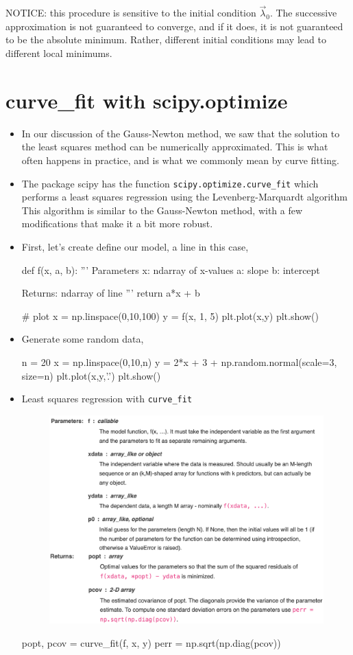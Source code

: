 \documentclass[12pt]{article}
\numberwithin{equation}{section}
\begin{document}
\begin{itemize}
NOTICE: this procedure is sensitive to the initial condition $ \vec{\lambda}_0 $. The successive approximation is not guaranteed to converge, and if it does, it is not guaranteed to be the absolute minimum. Rather, different initial conditions may lead to different local minimums.

\end{itemize}

\section{curve\_fit with scipy.optimize}
\begin{itemize}
\item In our discussion of the Gauss-Newton method, we saw that the solution to the least squares method can be numerically approximated. This is what often happens in practice, and is what we commonly mean by curve fitting.
\item The package scipy has the function \verb|scipy.optimize.curve_fit| which performs a least squares regression using the Levenberg-Marquardt algorithm This algorithm is similar to the Gauss-Newton method, with a few modifications that make it a bit more robust.
\item First, let's create define our model, a line in this case,
\begin{python}
def f(x, a, b):
	'''
	Parameters
		x: ndarray of x-values
		a: slope
		b: intercept
	
	Returns: ndarray of line
	'''
	return a*x + b
	
# plot
x = np.linspace(0,10,100)
y = f(x, 1, 5)
plt.plot(x,y)
plt.show()
\end{python}
\item Generate some random data,
\begin{python}
n = 20
x = np.linspace(0,10,n)
y = 2*x + 3 + np.random.normal(scale=3, size=n)
plt.plot(x,y,'.')
plt.show()
\end{python}

\item Least squares regression with \verb|curve_fit|
\begin{figure}[H]
	\centering
	\includegraphics[width=12cm] {cf}
\end{figure}
\begin{python}
popt, pcov = curve_fit(f, x, y)
perr = np.sqrt(np.diag(pcov))


\end{python}
\end{itemize}
\end{document}
